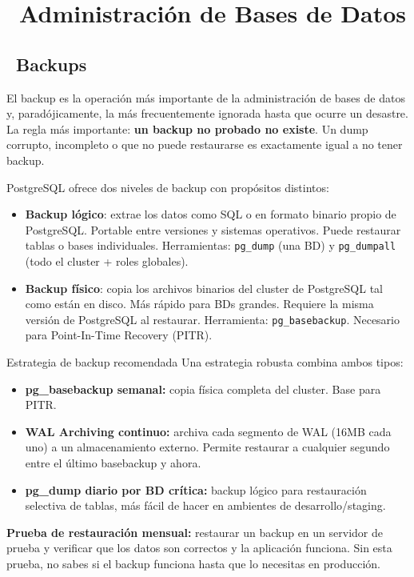 \chapter[Administración de Bases de Datos]{~Administración de Bases de Datos}

\section[Backups]{~Backups}

El backup es la operación más importante de la administración de bases de datos y, paradójicamente, la más frecuentemente ignorada hasta que ocurre un desastre.
La regla más importante: \textbf{un backup no probado no existe}.
Un dump corrupto, incompleto o que no puede restaurarse es exactamente igual a no tener backup.

PostgreSQL ofrece dos niveles de backup con propósitos distintos:
\begin{itemize}
  \item \textbf{Backup lógico}: extrae los datos como SQL o en formato binario propio de PostgreSQL.
    Portable entre versiones y sistemas operativos. Puede restaurar tablas o bases individuales.
    Herramientas: \texttt{pg\_dump} (una BD) y \texttt{pg\_dumpall} (todo el cluster + roles globales).
  \item \textbf{Backup físico}: copia los archivos binarios del cluster de PostgreSQL tal como están en disco.
    Más rápido para BDs grandes. Requiere la misma versión de PostgreSQL al restaurar.
    Herramienta: \texttt{pg\_basebackup}. Necesario para Point-In-Time Recovery (PITR).
\end{itemize}

\begin{teoriabox}{Estrategia de backup recomendada}
Una estrategia robusta combina ambos tipos:
\begin{itemize}
  \item \textbf{pg\_basebackup semanal:} copia física completa del cluster. Base para PITR.
  \item \textbf{WAL Archiving continuo:} archiva cada segmento de WAL (16MB cada uno) a un almacenamiento externo. Permite restaurar a cualquier segundo entre el último basebackup y ahora.
  \item \textbf{pg\_dump diario por BD crítica:} backup lógico para restauración selectiva de tablas, más fácil de hacer en ambientes de desarrollo/staging.
\end{itemize}
\textbf{Prueba de restauración mensual:} restaurar un backup en un servidor de prueba y verificar que los datos son correctos y la aplicación funciona.
Sin esta prueba, no sabes si el backup funciona hasta que lo necesitas en producción.
\end{teoriabox}

